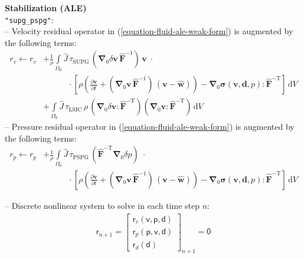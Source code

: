 \documentclass[a4paper,12pt]{report}
\newcommand{\bs}[1]{\boldsymbol{#1}}
\newcommand{\Om}{\mathit{\Omega}}
\newcommand{\ROP}{\bs{\mathsf{r}}}
\begin{document}
\textbf{Stabilization (ALE)}\\

\verb."supg_pspg".:\\
-- Velocity residual operator in (\ref{equation-fluid-ale-weak-form}) is augmented by the following terms:
\begin{equation}
\begin{aligned}
r_v \leftarrow r_v &+ \frac{1}{\rho}\int\limits_{\Om_0}\widehat{J}\, \tau_{\mathrm{SUPG}}\,(\bs{\nabla}_0\delta\bs{v}\,\widehat{\bs{F}}^{-1})\,\bs{v}\;\cdot \\
& \qquad\quad \cdot\left[\rho\left(\frac{\partial \bs{v}}{\partial t} + (\bs{\nabla}_0\bs{v}\,\widehat{\bs{F}}^{-1})\,(\bs{v}-\widehat{\bs{w}})\right) - \bs{\nabla}_{0} \bs{\sigma}(\bs{v},\bs{d},p) : \widehat{\bs{F}}^{-\mathrm{T}}\right]\,\mathrm{d}V \\
& + \int\limits_{\Om_0}\widehat{J}\, \tau_{\mathrm{LSIC}}\,\rho\,(\bs{\nabla}_{0}\delta\bs{v} : \widehat{\bs{F}}^{-\mathrm{T}})(\bs{\nabla}_{0}\bs{v} : \widehat{\bs{F}}^{-\mathrm{T}})\,\mathrm{d}V
\end{aligned}
\end{equation}
-- Pressure residual operator in (\ref{equation-fluid-ale-weak-form}) is augmented by the following terms:
\begin{equation}
\begin{aligned}
r_p \leftarrow r_p &+ \frac{1}{\rho}\int\limits_{\Om_0}\widehat{J}\, \tau_{\mathrm{PSPG}}\,(\widehat{\bs{F}}^{-\mathrm{T}}\bs{\nabla}_{0}\delta p) \;\cdot \\
& \qquad\quad \cdot \left[\rho\left(\frac{\partial \bs{v}}{\partial t} + (\bs{\nabla}_0\bs{v}\,\widehat{\bs{F}}^{-1})\,(\bs{v}-\widehat{\bs{w}})\right) - \bs{\nabla}_{0} \bs{\sigma}(\bs{v},\bs{d},p) : \widehat{\bs{F}}^{-\mathrm{T}}\right]\,\mathrm{d}V
\end{aligned}
\end{equation}

-- Discrete nonlinear system to solve in each time step $n$:
\begin{equation}
\label{equation-nonlin-sys-fluid-ale}
\begin{aligned}
\ROP_{n+1} = \begin{bmatrix} \ROP_{v}(\bs{\mathsf{v}},\bs{\mathsf{p}},\bs{\mathsf{d}}) \\ \ROP_{p}(\bs{\mathsf{p}},\bs{\mathsf{v}},\bs{\mathsf{d}}) \\ \ROP_{d}(\bs{\mathsf{d}}) \end{bmatrix}_{n+1} = \bs{\mathsf{0}}
\end{aligned}
\end{equation}
\end{document}
